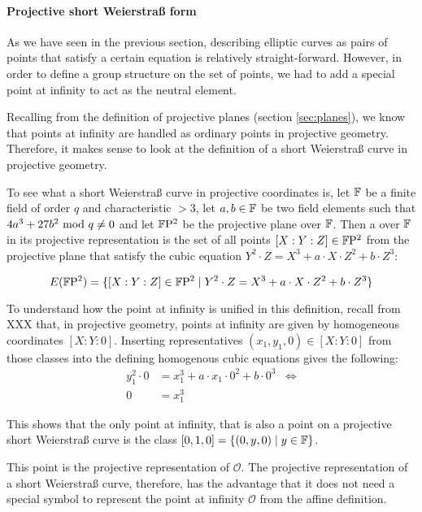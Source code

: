 \paragraph{Projective short Weierstraß form}
As we have seen in the previous section, describing elliptic curves as pairs of points that satisfy a certain equation is relatively straight-forward. However, in order to define a group structure on the set of points, we had to add a special point at infinity to act as the neutral element. 

Recalling from the definition of projective planes (section \ref{sec:planes}), we know that points at infinity are handled as ordinary points in projective geometry. Therefore, it makes  sense to look at the definition of a short Weierstraß curve in projective geometry.

To see what a short Weierstraß curve in projective coordinates is, let $\mathbb{F}$ be a finite field of order $q$ and characteristic $>3$, let $a,b\in \mathbb{F}$ be two field elements such that $4a^3+ 27b^2 \text{ mod } q\neq 0$ and let $\mathbb{F}\mathrm{P}^2$ be the projective plane over $\mathbb{F}$. Then a  over $\mathbb{F}$ in its projective representation is the set of all points $[X:Y:Z]\in \mathbb{F}\mathrm{P}^2$ from the projective plane that satisfy the  cubic equation $Y^2\cdot Z = X^3+a\cdot X\cdot Z^2 + b\cdot Z^3$:

\begin{equation}
E(\mathbb{F}\mathrm{P}^2) = \{[X:Y:Z]\in \mathbb{F}\mathrm{P}^2\;|\; Y^2\cdot Z = X^3+a\cdot X\cdot Z^2 + b\cdot Z^3 \}
\end{equation}

To understand how the point at infinity is unified in this definition, recall from XXX that, in projective geometry, points at infinity are given by homogeneous coordinates $[X:Y:0]$. Inserting representatives $(x_1,y_1,0)\in [X:Y:0]$ from those classes into the defining homogenous cubic equations gives the following:
\begin{align*}
y_1^2\cdot 0 & = x_1^3+a\cdot x_1\cdot 0^2 + b\cdot 0^3 & \Leftrightarrow \\
0 & = x_1^3
\end{align*} 

This shows that the only point at infinity, that is also a point on a projective short Weierstraß curve is the class $[0,1,0] = \{(0,y,0)\;|\; y\in \mathbb{F}\}$.

This point is the projective representation of $\mathcal{O}$. The projective representation of a short Weierstraß curve, therefore, has the advantage that it does not need a special symbol to represent the point at infinity $\mathcal{O}$ from the affine definition.

